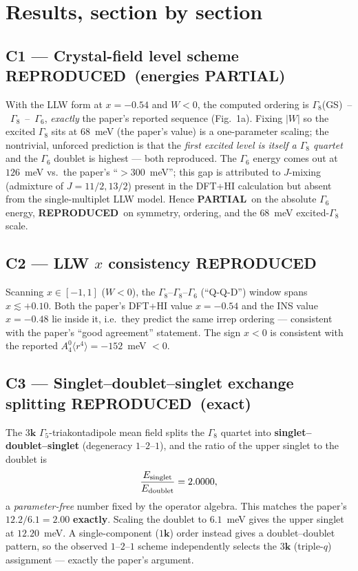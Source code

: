 \documentclass[11pt]{article}
\newcommand{\reprod}{\textcolor{green!55!black}{\textbf{REPRODUCED}}}
\newcommand{\partl}{\textcolor{orange!85!black}{\textbf{PARTIAL}}}
\begin{document}
\section{Results, section by section}

\subsection*{C1 --- Crystal-field level scheme \reprod\ (energies \partl)}
With the LLW form at $x=-0.54$ and $W<0$, the computed ordering is
$\Gamma_8$(GS)~--~$\Gamma_8$~--~$\Gamma_6$, \emph{exactly} the paper's reported
sequence (Fig.~1a). Fixing $|W|$ so the excited $\Gamma_8$ sits at $68$~meV (the
paper's value) is a one-parameter scaling; the nontrivial, unforced prediction is
that the \emph{first excited level is itself a $\Gamma_8$ quartet} and the
$\Gamma_6$ doublet is highest --- both reproduced. The $\Gamma_6$ energy comes out
at $126$~meV vs.\ the paper's ``$>300$~meV''; this gap is attributed to $J$-mixing
(admixture of $J=11/2,13/2$) present in the DFT+HI calculation but absent from the
single-multiplet LLW model. Hence \partl\ on the absolute $\Gamma_6$ energy,
\reprod\ on symmetry, ordering, and the $68$~meV excited-$\Gamma_8$ scale.

\subsection*{C2 --- LLW $x$ consistency \reprod}
Scanning $x\in[-1,1]$ ($W<0$), the $\Gamma_8$--$\Gamma_8$--$\Gamma_6$
(``Q-Q-D'') window spans $x\lesssim+0.10$. Both the paper's DFT+HI value
$x=-0.54$ and the INS value $x=-0.48$ lie inside it, i.e.\ they predict the same
irrep ordering --- consistent with the paper's ``good agreement'' statement. The
sign $x<0$ is consistent with the reported $A_4^0\langle r^4\rangle=-152$~meV
$<0$.

\subsection*{C3 --- Singlet--doublet--singlet exchange splitting \reprod\ (exact)}
The $3\mathbf{k}$ $\Gamma_5$-triakontadipole mean field splits the $\Gamma_8$
quartet into \textbf{singlet--doublet--singlet} (degeneracy $1$--$2$--$1$), and the
ratio of the upper singlet to the doublet is
\[
\frac{E_{\rm singlet}}{E_{\rm doublet}} = 2.0000,
\]
a \emph{parameter-free} number fixed by the operator algebra. This matches the
paper's $12.2/6.1=2.00$ \textbf{exactly}. Scaling the doublet to $6.1$~meV gives
the upper singlet at $12.20$~meV. A single-component ($1\mathbf{k}$) order instead
gives a doublet--doublet pattern, so the observed $1$--$2$--$1$ scheme
independently selects the $3\mathbf{k}$ (triple-$q$) assignment --- exactly the
paper's argument.
\end{document}

